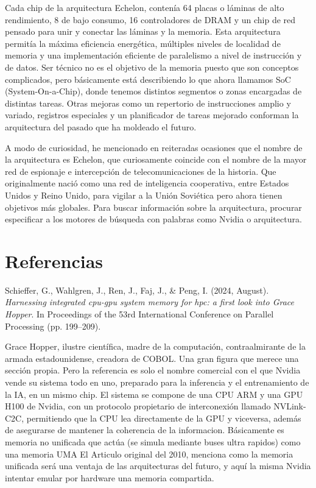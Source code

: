 \documentclass[12pt,a4paper,twoside,openright]{report}
\begin{document}
Cada chip de la arquitectura Echelon, contenía 64 placas o láminas de alto rendimiento, 8 de bajo consumo, 16 controladores de DRAM y un chip de red pensado para unir y conectar las láminas y la memoria. Esta arquitectura permitía la máxima eficiencia energética, múltiples niveles de localidad de memoria y una implementación eficiente de paralelismo a nivel de instrucción y de datos.
Ser técnico no es el objetivo de la memoria puesto que son conceptos complicados, pero básicamente está describiendo lo que ahora llamamos SoC (System-On-a-Chip), donde tenemos distintos segmentos o zonas encargadas de distintas tareas. Otras mejoras como un repertorio de instrucciones amplio y variado, registros especiales y un planificador de tareas mejorado conforman la arquitectura del pasado que ha moldeado el futuro.

\bigskip

A modo de curiosidad, he mencionado en reiteradas ocasiones que el nombre de la arquitectura es Echelon, que curiosamente coincide con el nombre de la mayor red de espionaje e intercepción de telecomunicaciones de la historia.
Que originalmente nació como una red de inteligencia cooperativa, entre Estados Unidos y Reino Unido, para vigilar a la Unión Soviética pero ahora tienen objetivos más globales. Para buscar información sobre la arquitectura, procurar especificar a los motores de búsqueda con palabras como Nvidia o arquitectura.

\section{Referencias}

\begin{tcolorbox}[
    blanker,
    left=12pt, right=12pt,
    top=8pt, bottom=8pt,
    before skip=10pt, after skip=10pt
]
\small
Schieffer, G., Wahlgren, J., Ren, J., Faj, J., \& Peng, I. (2024, August). \emph{Harnessing integrated cpu-gpu system memory for hpc: a first look into Grace Hopper}. In Proceedings of the 53rd International Conference on Parallel Processing (pp. 199--209).
\end{tcolorbox}

Grace Hopper, ilustre científica, madre de la computación, contraalmirante de la armada estadounidense, creadora de COBOL.
Una gran figura que merece una sección propia. Pero la referencia es solo el nombre comercial con el que Nvidia vende su sistema todo en uno, preparado para la inferencia y el entrenamiento de la IA, en un mismo chip.
El sistema se compone de una CPU ARM y una GPU H100 de Nvidia, con un protocolo propietario de interconexión llamado NVLink-C2C, permitiendo que la CPU lea directamente de la GPU y viceversa, además de asegurarse de mantener la coherencia de la informacion.
Básicamente es memoria no unificada que actúa (se simula mediante buses ultra rapidos) como una memoria UMA
El Articulo original del 2010, menciona como la memoria unificada será una ventaja de las arquitecturas del futuro, y aquí la misma Nvidia intentar emular por hardware una memoria compartida.
\end{document}
